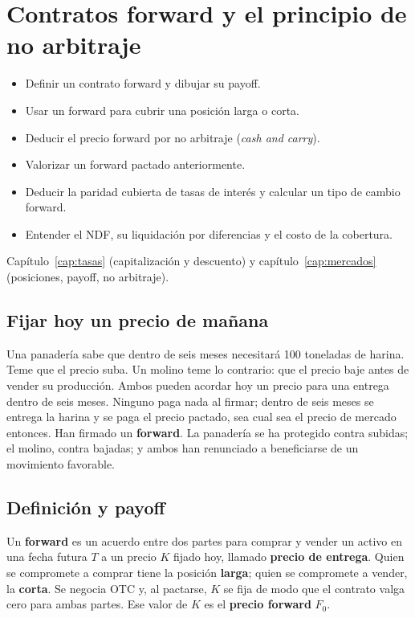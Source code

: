 \chapter{Contratos forward y el principio de no arbitraje}\label{cap:forwards}

\begin{objetivos}
\begin{itemize}
\item Definir un contrato forward y dibujar su payoff.
\item Usar un forward para cubrir una posición larga o corta.
\item Deducir el precio forward por no arbitraje (\emph{cash and carry}).
\item Valorizar un forward pactado anteriormente.
\item Deducir la paridad cubierta de tasas de interés y calcular un tipo de cambio forward.
\item Entender el NDF, su liquidación por diferencias y el costo de la cobertura.
\end{itemize}
\end{objetivos}

\begin{prerreq}Capítulo~\ref{cap:tasas} (capitalización y descuento) y capítulo~\ref{cap:mercados} (posiciones, payoff, no arbitraje).\end{prerreq}

\section{Fijar hoy un precio de mañana}

Una panadería sabe que dentro de seis meses necesitará 100 toneladas de harina. Teme que el precio suba. Un molino teme lo contrario: que el precio baje antes de vender su producción. Ambos pueden acordar hoy un precio para una entrega dentro de seis meses. Ninguno paga nada al firmar; dentro de seis meses se entrega la harina y se paga el precio pactado, sea cual sea el precio de mercado entonces. Han firmado un \textbf{forward}. La panadería se ha protegido contra subidas; el molino, contra bajadas; y ambos han renunciado a beneficiarse de un movimiento favorable.

\section{Definición y payoff}

\begin{definicion}
Un \textbf{forward} es un acuerdo entre dos partes para comprar y vender un activo en una fecha futura $T$ a un precio $K$ fijado hoy, llamado \textbf{precio de entrega}. Quien se compromete a comprar tiene la posición \textbf{larga}; quien se compromete a vender, la \textbf{corta}. Se negocia OTC y, al pactarse, $K$ se fija de modo que el contrato valga cero para ambas partes. Ese valor de $K$ es el \textbf{precio forward} $F_0$.
\end{definicion}

